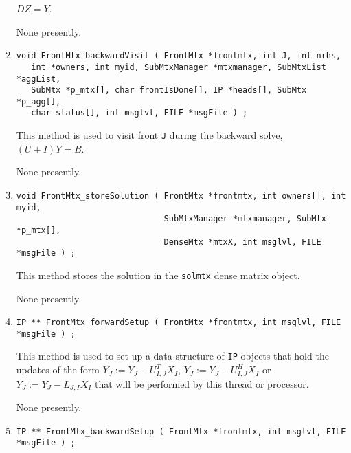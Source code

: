 \begin{enumerate}
$DZ = Y$.
\par {}
None presently.
\item
\begin{verbatim}
void FrontMtx_backwardVisit ( FrontMtx *frontmtx, int J, int nrhs,
   int *owners, int myid, SubMtxManager *mtxmanager, SubMtxList *aggList,
   SubMtx *p_mtx[], char frontIsDone[], IP *heads[], SubMtx *p_agg[],
   char status[], int msglvl, FILE *msgFile ) ;
\end{verbatim}
This method is used to visit front {\tt J} during the backward solve,
$(U + I)Y = B$.
\par {}
None presently.
\item
\begin{verbatim}
void FrontMtx_storeSolution ( FrontMtx *frontmtx, int owners[], int myid, 
                              SubMtxManager *mtxmanager, SubMtx *p_mtx[],
                              DenseMtx *mtxX, int msglvl, FILE *msgFile ) ;
\end{verbatim}
This method stores the solution in the {\tt solmtx} dense matrix object.
\par {}
None presently.
\item
\begin{verbatim}
IP ** FrontMtx_forwardSetup ( FrontMtx *frontmtx, int msglvl, FILE *msgFile ) ;
\end{verbatim}
This method is used to set up a data structure of {\tt IP} objects
that hold the updates of the form
$Y_J := Y_J - U_{I,J}^T X_I$,
$Y_J := Y_J - U_{I,J}^H X_I$ or
$Y_J := Y_J - L_{J,I} X_I$
that will be performed by this thread or processor.
\par {}
None presently.
\item
\begin{verbatim}
IP ** FrontMtx_backwardSetup ( FrontMtx *frontmtx, int msglvl, FILE *msgFile ) ;
\end{verbatim}

\end{enumerate}
